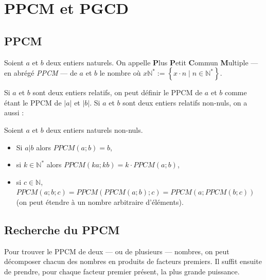 \section{PPCM et PGCD}
      \subsection{PPCM}
      \begin{defi}
      Soient $a$ et $b$ deux entiers naturels.
      On appelle \textbf{P}lus \textbf{P}etit \textbf{C}ommun \textbf{M}ultiple 
      --- en abr\'eg\'e \emph{PPCM} --- de $a$ et $b$ le nombre 
            o\`u $x\mathbb{N}^* := \left\lbrace x \cdot n \mid n \in \mathbb{N}^* \right\rbrace$.
      
                 
      Si $a$ et $b$ sont deux entiers relatifs, 
      on peut d\'efinir le PPCM de $a$ et $b$ comme \'etant le PPCM de $|a|$ et $|b|$.
      Si $a$ et $b$ sont deux entiers relatifs non-nuls, on a aussi :
      \end{defi}
      \begin{prop}
            Soient $a$ et $b$ deux entiers naturels non-nuls.
            \begin{itemize}
                  \item Si $a|b$ alors $PPCM(a;b) = b$,
                  \item si $k\in\mathbb{N}^*$ alors $PPCM(ka;kb) = k \cdot PPCM(a;b)$,
                  \item si $c\in\mathbb{N}$, $PPCM(a;b;c) = PPCM(PPCM(a;b);c) = PPCM(a;PPCM(b;c))$
                        (on peut \'etendre \`a un nombre arbitraire d'\'el\'ements).
            \end{itemize}
      \end{prop}
      \subsection*{Recherche du PPCM}
            Pour trouver le PPCM de deux --- ou de plusieurs --- nombres, 
            on peut d\'ecomposer chacun des nombres en produits de facteurs premiers.
            Il suffit ensuite de prendre, pour chaque facteur premier pr\'esent, la plus grande puissance.
            
